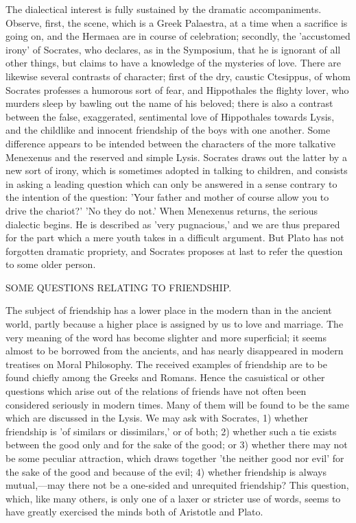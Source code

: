 \documentclass[11pt,letter]{article}
\begin{document}
\par  The dialectical interest is fully sustained by the dramatic accompaniments. Observe, first, the scene, which is a Greek Palaestra, at a time when a sacrifice is going on, and the Hermaea are in course of celebration; secondly, the 'accustomed irony' of Socrates, who declares, as in the Symposium, that he is ignorant of all other things, but claims to have a knowledge of the mysteries of love. There are likewise several contrasts of character; first of the dry, caustic Ctesippus, of whom Socrates professes a humorous sort of fear, and Hippothales the flighty lover, who murders sleep by bawling out the name of his beloved; there is also a contrast between the false, exaggerated, sentimental love of Hippothales towards Lysis, and the childlike and innocent friendship of the boys with one another. Some difference appears to be intended between the characters of the more talkative Menexenus and the reserved and simple Lysis. Socrates draws out the latter by a new sort of irony, which is sometimes adopted in talking to children, and consists in asking a leading question which can only be answered in a sense contrary to the intention of the question: 'Your father and mother of course allow you to drive the chariot?' 'No they do not.' When Menexenus returns, the serious dialectic begins. He is described as 'very pugnacious,' and we are thus prepared for the part which a mere youth takes in a difficult argument. But Plato has not forgotten dramatic propriety, and Socrates proposes at last to refer the question to some older person.

\par  SOME QUESTIONS RELATING TO FRIENDSHIP.

\par  The subject of friendship has a lower place in the modern than in the ancient world, partly because a higher place is assigned by us to love and marriage. The very meaning of the word has become slighter and more superficial; it seems almost to be borrowed from the ancients, and has nearly disappeared in modern treatises on Moral Philosophy. The received examples of friendship are to be found chiefly among the Greeks and Romans. Hence the casuistical or other questions which arise out of the relations of friends have not often been considered seriously in modern times. Many of them will be found to be the same which are discussed in the Lysis. We may ask with Socrates, 1) whether friendship is 'of similars or dissimilars,' or of both; 2) whether such a tie exists between the good only and for the sake of the good; or 3) whether there may not be some peculiar attraction, which draws together 'the neither good nor evil' for the sake of the good and because of the evil; 4) whether friendship is always mutual,—may there not be a one-sided and unrequited friendship? This question, which, like many others, is only one of a laxer or stricter use of words, seems to have greatly exercised the minds both of Aristotle and Plato.
\end{document}
